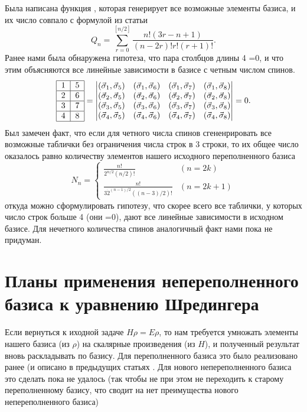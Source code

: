 \documentclass[]{article}
\begin{document}
Была написана функция \cite{basis_gen_code}, которая генерирует все возможные элементы базиса, и их число совпало с формулой из статьи\cite{source_article}
$$Q_n = \sum_{r=0}^{[n/2]}\frac{n!(3r-n+1)}{(n-2r)!r!(r+1)!}.$$
Ранее нами была обнаружена гипотеза, что пара столбцов длины 4 =0, и что этим объясняются все линейные зависимости в базисе с четным числом спинов.
$$ \begin{tabular}{ |l|l| }
\hline
1 & 5 \\ \hline
2 & 6\\ \hline
3 & 7\\ \hline
4 & 8\\
\hline
\end{tabular}
= 
\begin{vmatrix}
(\vec\sigma_1,\vec\sigma_5) & (\vec\sigma_1,\vec\sigma_6) & (\vec\sigma_1,\vec\sigma_7) & (\vec\sigma_1,\vec\sigma_8)\\
(\vec\sigma_2,\vec\sigma_5) & (\vec\sigma_2,\vec\sigma_6) & (\vec\sigma_2,\vec\sigma_7) & (\vec\sigma_2,\vec\sigma_8)\\
(\vec\sigma_3,\vec\sigma_5) & (\vec\sigma_3,\vec\sigma_6) & (\vec\sigma_3,\vec\sigma_7) & (\vec\sigma_3,\vec\sigma_8)\\
(\vec\sigma_4,\vec\sigma_5) & (\vec\sigma_4,\vec\sigma_6) & (\vec\sigma_4,\vec\sigma_7) & (\vec\sigma_4,\vec\sigma_8)\\
\end{vmatrix}
=0 .
$$
Был замечен факт, что если для четного числа спинов сгененрировать все возможные таблички без ограничения числа строк в 3 строки,
то их общее число оказалось равно количеству элементов нашего исходного переполненного базиса
$$N_n=\begin{cases}
\frac{n!}{2^{n/2}(n/2)!} & (n=2k)\\
\frac{n!}{3\dot 2^{(n-1)/2}((n-3)/2)!} & (n=2k+1)
\end{cases}$$
откуда можно сформулировать гипотезу, что скорее всего все таблички, у которых число строк больше 4 (они =0), дают все линейные зависимости в исходном базисе.
Для нечетного количества спинов аналогичный факт нами пока не придуман.

\section{Планы применения непереполненного базиса к уравнению Шредингера}
Если вернуться к иходной задаче $H \rho = E \rho$, то 
нам требуется умножать элементы нашего базиса (из $\rho$) на скалярные произведения (из $H$), и полученный результат вновь раскладывать по базису.
Для переполненного базиса это было реализовано ранее (и описано в предыдущих статьях \cite{variational}.
Для нового непереполненного базиса это сделать пока не удалось (так чтобы не при этом не переходить к старому переполненному базису, что сводит на нет преимущества нового непереполненного базиса)
\end{document}
